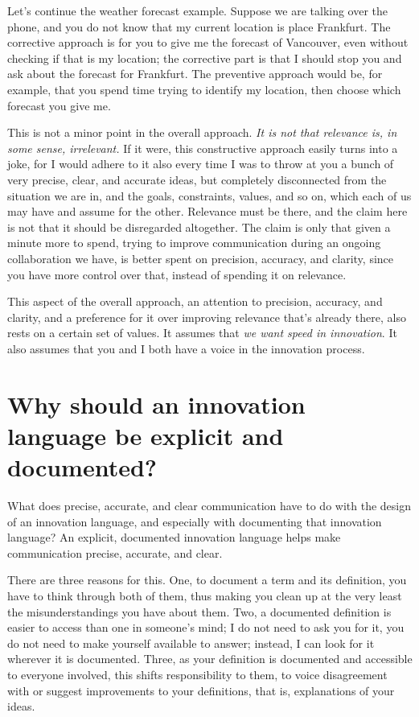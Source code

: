 Let's continue the weather forecast example. Suppose we are talking over the phone, and you do not know that my current location is place Frankfurt. The corrective approach is for you to give me the forecast of Vancouver, even without checking if that is my location; the corrective part is that I should stop you and ask about the forecast for Frankfurt. The preventive approach would be, for example, that you spend time trying to identify my location, then choose which forecast you give me. 

This is not a minor point in the overall approach. \textit{It is not that relevance is, in some sense, irrelevant.} If it were, this constructive approach easily turns into a joke, for I would adhere to it also every time I was to throw at you a bunch of very precise, clear, and accurate ideas, but completely disconnected from the situation we are in, and the goals, constraints, values, and so on, which each of us may have and assume for the other. Relevance must be there, and the claim here is not that it should be disregarded altogether. The claim is only that given a minute more to spend, trying to improve communication during an ongoing collaboration we have, is better spent on precision, accuracy, and clarity, since you have more control over that, instead of spending it on relevance.

This aspect of the overall approach, an attention to precision, accuracy, and clarity, and a preference for it over improving relevance that's already there, also rests on a certain set of values. It assumes that \textit{we want speed in innovation}. It also assumes that you and I both have a voice in the innovation process.


\section{Why should an innovation language be explicit and documented?}
\label{c2:s7}
What does precise, accurate, and clear communication have to do with the design of an innovation language, and especially with documenting that innovation language? An explicit, documented innovation language helps make communication precise, accurate, and clear. 

There are three reasons for this. One, to document a term and its definition, you have to think through both of them, thus making you clean up at the very least the misunderstandings you have about them. Two, a documented definition is easier to access than one in someone's mind; I do not need to ask you for it, you do not need to make yourself available to answer; instead, I can look for it wherever it is documented. Three, as your definition is documented and accessible to everyone involved, this shifts responsibility to them, to voice disagreement with or suggest improvements to your definitions, that is, explanations of your ideas.


